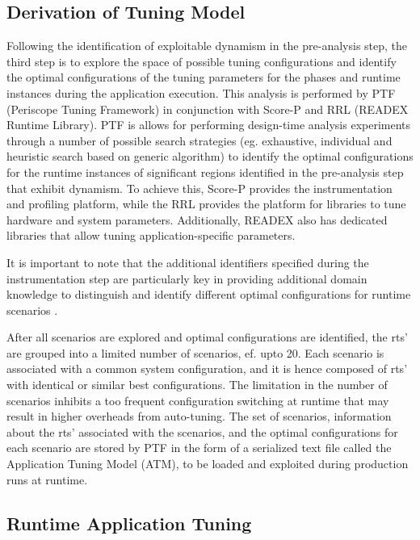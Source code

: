 \subsection{Derivation of Tuning Model}
\label{sec:tuning_model_generation}
Following the identification of exploitable dynamism in the pre-analysis step, the third step is to explore the space of possible tuning configurations and identify the optimal configurations of the tuning parameters for the phases and runtime instances during the application execution. This analysis is performed by PTF (Periscope Tuning Framework) in conjunction with Score-P and RRL (READEX Runtime Library). PTF is allows for performing design-time analysis experiments through a number of possible search strategies (eg. exhaustive, individual and heuristic search based on generic algorithm) to identify the optimal configurations for the runtime instances of significant regions identified in the pre-analysis step that exhibit dynamism. To achieve this, Score-P provides the instrumentation and profiling platform, while the RRL provides the platform for libraries to tune hardware and system parameters. Additionally, READEX also has dedicated libraries that allow tuning application-specific parameters.

It is important to note that the additional identifiers specified during the instrumentation step are particularly key in providing additional domain knowledge to distinguish and identify different optimal configurations for runtime scenarios \cite{PACO17}.

After all scenarios are explored and optimal configurations are identified, the rts' are grouped into a limited number of scenarios, ef. upto 20. Each scenario is associated with a common system configuration, and it is hence composed of rts' with identical or similar best configurations. The limitation in the number of scenarios inhibits a too frequent configuration switching at runtime that may result in higher overheads from auto-tuning. The set of scenarios, information about the rts' associated with the scenarios, and the optimal configurations for each scenario are stored by PTF in the form of a serialized text file called the Application Tuning Model (ATM), to be loaded and exploited during production runs at runtime.

\subsection{Runtime Application Tuning}
\label{sec:runtime_tuning}


